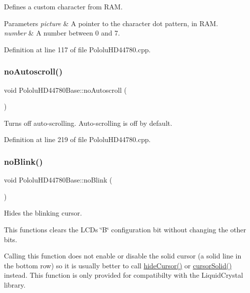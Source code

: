 Defines a custom character from R\+AM. 
\begin{DoxyParams}{Parameters}
{\em picture} & A pointer to the character dot pattern, in R\+AM. \\
\hline
{\em number} & A number between 0 and 7. \\
\hline
\end{DoxyParams}


Definition at line 117 of file Pololu\+H\+D44780.\+cpp.

\mbox{\label{class_pololu_h_d44780_base_aee80e23d270913dd2c353e7bd5408249}} 
\subsubsection{\texorpdfstring{no\+Autoscroll()}{noAutoscroll()}}
{\footnotesize\ttfamily void Pololu\+H\+D44780\+Base\+::no\+Autoscroll (\begin{DoxyParamCaption}{ }\end{DoxyParamCaption})}

Turns off auto-\/scrolling. Auto-\/scrolling is off by default. 

Definition at line 219 of file Pololu\+H\+D44780.\+cpp.

\mbox{\label{class_pololu_h_d44780_base_a301afc921881052b166e11cd45ad9696}} 
\subsubsection{\texorpdfstring{no\+Blink()}{noBlink()}}
{\footnotesize\ttfamily void Pololu\+H\+D44780\+Base\+::no\+Blink (\begin{DoxyParamCaption}{ }\end{DoxyParamCaption})}

Hides the blinking cursor.

This functions clears the L\+CD\textquotesingle{}s \char`\"{}\+B\char`\"{} configuration bit without changing the other bits.

Calling this function does not enable or disable the solid cursor (a solid line in the bottom row) so it is usually better to call \hyperlink{class_pololu_h_d44780_base_a1db083d254d251c479a577f29bcdcec8}{hide\+Cursor()} or \hyperlink{class_pololu_h_d44780_base_a6a4d8e79beda9f7c81659a8e13c8c338}{cursor\+Solid()} instead. This function is only provided for compatibilty with the Liquid\+Crystal library. 

